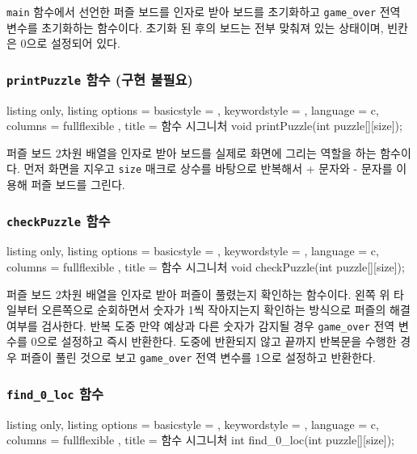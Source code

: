 \documentclass{article}
\newcommand{\code}[1]{
  \texttt{\large{#1}}
}
\begin{document}
\code{main} 함수에서 선언한 퍼즐 보드를 인자로 받아 보드를 초기화하고 \code{game\_over} 전역 변수를 초기화하는 함수이다. 초기화 된 후의 보드는 전부 맞춰져 있는 상태이며, 빈칸은 0으로 설정되어 있다.

\subsubsection{\code{printPuzzle} 함수 (구현 불필요)}

\begin{tcblisting}{
    listing only,
    listing options = {
      basicstyle = \ttfamily,
      keywordstyle = \color{blue},
      language = c,
      columns = fullflexible
    },
    title = 함수 시그니처
  }void printPuzzle(int puzzle[][size]);
\end{tcblisting}

퍼즐 보드 2차원 배열을 인자로 받아 보드를 실제로 화면에 그리는 역할을 하는 함수이다. 먼저 화면을 지우고 \code{size} 매크로 상수를 바탕으로 반복해서 + 문자와 - 문자를 이용해 퍼즐 보드를 그린다.

\subsubsection{\code{checkPuzzle} 함수}

\begin{tcblisting}{
    listing only,
    listing options = {
      basicstyle = \ttfamily,
      keywordstyle = \color{blue},
      language = c,
      columns = fullflexible
    },
    title = 함수 시그니처
  }void checkPuzzle(int puzzle[][size]);
\end{tcblisting}

퍼즐 보드 2차원 배열을 인자로 받아 퍼즐이 풀렸는지 확인하는 함수이다. 왼쪽 위 타일부터 오른쪽으로 순회하면서 숫자가 1씩 작아지는지 확인하는 방식으로 퍼즐의 해결 여부를 검사한다. 반복 도중 만약 예상과 다른 숫자가 감지될 경우 \code{game\_over} 전역 변수를 0으로 설정하고 즉시 반환한다. 도중에 반환되지 않고 끝까지 반복문을 수행한 경우 퍼즐이 풀린 것으로 보고 \code{game\_over} 전역 변수를 1으로 설정하고 반환한다.

\subsubsection{\code{find\_0\_loc} 함수}

\begin{tcblisting}{
    listing only,
    listing options = {
      basicstyle = \ttfamily,
      keywordstyle = \color{blue},
      language = c,
      columns = fullflexible
    },
    title = 함수 시그니처
  }int find_0_loc(int puzzle[][size]);
\end{tcblisting}
\end{document}
